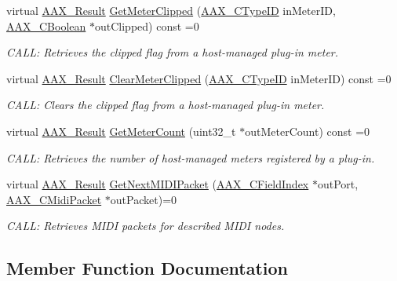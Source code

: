 \begin{DoxyCompactItemize}
virtual \hyperlink{a00149_a4d8f69a697df7f70c3a8e9b8ee130d2f}{A\+A\+X\+\_\+\+Result} \hyperlink{a00053_a69fa28a0887223cce230d8380945ecb5}{Get\+Meter\+Clipped} (\hyperlink{a00149_ac678f9c1fbcc26315d209f71a147a175}{A\+A\+X\+\_\+\+C\+Type\+I\+D} in\+Meter\+I\+D, \hyperlink{a00149_aa216506530f1d19a2965931ced2b274b}{A\+A\+X\+\_\+\+C\+Boolean} $\ast$out\+Clipped) const =0
\begin{DoxyCompactList}\small\item\em C\+A\+L\+L\+: Retrieves the clipped flag from a host-\/managed plug-\/in meter. \end{DoxyCompactList}\item 
virtual \hyperlink{a00149_a4d8f69a697df7f70c3a8e9b8ee130d2f}{A\+A\+X\+\_\+\+Result} \hyperlink{a00053_a93d824d7415416028b2a7d5561deab58}{Clear\+Meter\+Clipped} (\hyperlink{a00149_ac678f9c1fbcc26315d209f71a147a175}{A\+A\+X\+\_\+\+C\+Type\+I\+D} in\+Meter\+I\+D) const =0
\begin{DoxyCompactList}\small\item\em C\+A\+L\+L\+: Clears the clipped flag from a host-\/managed plug-\/in meter. \end{DoxyCompactList}\item 
virtual \hyperlink{a00149_a4d8f69a697df7f70c3a8e9b8ee130d2f}{A\+A\+X\+\_\+\+Result} \hyperlink{a00053_aaf316786f9f280cd5711848eeeec3d99}{Get\+Meter\+Count} (uint32\+\_\+t $\ast$out\+Meter\+Count) const =0
\begin{DoxyCompactList}\small\item\em C\+A\+L\+L\+: Retrieves the number of host-\/managed meters registered by a plug-\/in. \end{DoxyCompactList}\item 
virtual \hyperlink{a00149_a4d8f69a697df7f70c3a8e9b8ee130d2f}{A\+A\+X\+\_\+\+Result} \hyperlink{a00053_a6a5c0cdfbe314476bdfd15caaee8d010}{Get\+Next\+M\+I\+D\+I\+Packet} (\hyperlink{a00149_ae807f8986143820cfb5d6da32165c9c7}{A\+A\+X\+\_\+\+C\+Field\+Index} $\ast$out\+Port, \hyperlink{a00024}{A\+A\+X\+\_\+\+C\+Midi\+Packet} $\ast$out\+Packet)=0
\begin{DoxyCompactList}\small\item\em C\+A\+L\+L\+: Retrieves M\+I\+D\+I packets for described M\+I\+D\+I nodes. \end{DoxyCompactList}\end{DoxyCompactItemize}


\subsection{Member Function Documentation}
\hypertarget{a00053_ae1ccab17cf8b38ab415a7f097cb7d683}{}
